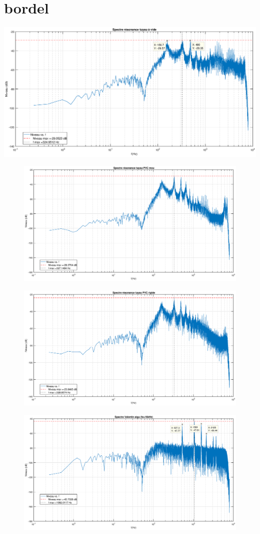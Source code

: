 \documentclass[12pt,a4paper]{article}
\begin{document}
\section{bordel}
\begin{bigcenter}
		\includegraphics[width=1.5\linewidth]{"Resonance tuyau a vide"}			
\end{bigcenter}
\begin{figure}
	\centering
	\includegraphics[width=0.7\linewidth]{"res/Resonance tuyau PVC mou"}
	\caption{}
	\label{fig:resonance-tuyau-pvc-mou}
\end{figure}
\begin{figure}
	\centering
	\includegraphics[width=0.7\linewidth]{"res/Resonance tuyau PVC rigide"}
	\caption{}
	\label{fig:resonance-tuyau-pvc-rigide}
\end{figure}
\begin{figure}
	\centering
	\includegraphics[width=0.7\linewidth]{"res/Valentin aigu"}
	\caption{}
	\label{fig:valentin-aigu}
\end{figure}
\end{document}
